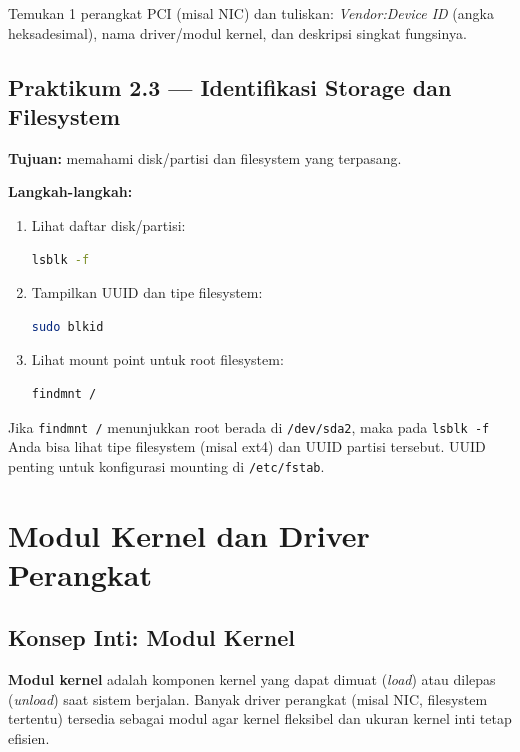 \begin{exercisebox}[2.2]
Temukan 1 perangkat PCI (misal NIC) dan tuliskan: \textit{Vendor:Device ID} (angka heksadesimal), nama driver/modul kernel, dan deskripsi singkat fungsinya.
\end{exercisebox}

\subsection*{Praktikum 2.3 --- Identifikasi Storage dan Filesystem}
\textbf{Tujuan:} memahami disk/partisi dan filesystem yang terpasang.

\textbf{Langkah-langkah:}
\begin{enumerate}
    \item Lihat daftar disk/partisi:
\begin{lstlisting}[language=bash, caption={Melihat block device dan filesystem}]
lsblk -f
\end{lstlisting}

    \item Tampilkan UUID dan tipe filesystem:
\begin{lstlisting}[language=bash, caption={Melihat UUID filesystem}]
sudo blkid
\end{lstlisting}

    \item Lihat mount point untuk root filesystem:
\begin{lstlisting}[language=bash, caption={Melihat device untuk root filesystem}]
findmnt /
\end{lstlisting}
\end{enumerate}

\begin{examplebox}
Jika \texttt{findmnt /} menunjukkan root berada di \texttt{/dev/sda2}, maka pada \texttt{lsblk -f} Anda bisa lihat tipe filesystem (misal ext4)
dan UUID partisi tersebut. UUID penting untuk konfigurasi mounting di \texttt{/etc/fstab}.
\end{examplebox}


\section{Modul Kernel dan Driver Perangkat}
\label{sec:kernel-modules}

\subsection*{Konsep Inti: Modul Kernel}
\textbf{Modul kernel} adalah komponen kernel yang dapat dimuat (\textit{load}) atau dilepas (\textit{unload}) saat sistem berjalan.
Banyak driver perangkat (misal NIC, filesystem tertentu) tersedia sebagai modul agar kernel fleksibel dan ukuran kernel inti tetap efisien.

